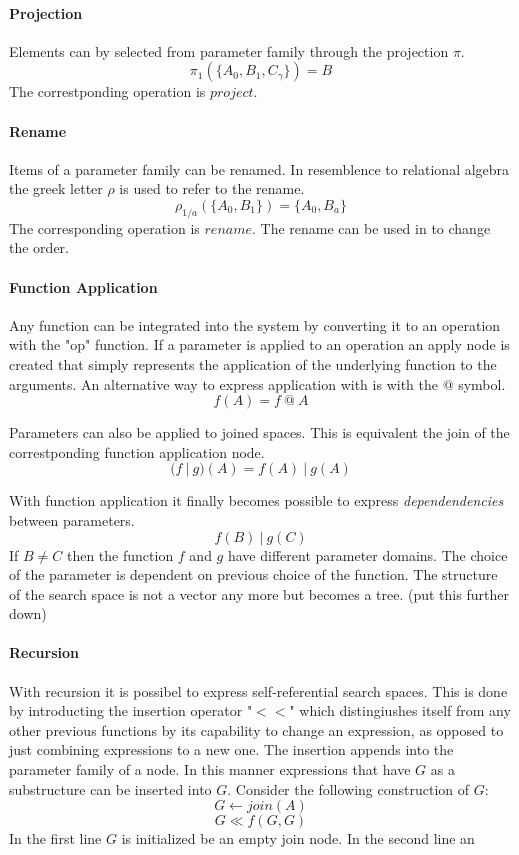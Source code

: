 \documentclass[english]{article}
\begin{document}
\paragraph{Projection}
Elements can by selected from parameter family through the projection $\pi$.
$$\pi_1(\{A_0, B_1, C_\gamma\}) = B$$
The correstponding operation is $project$.

\paragraph{Rename}
Items of a parameter family can be renamed. In resemblence to relational algebra the greek letter $\rho$ is used to refer to the rename.
$$\rho_{1/a}(\{A_{0}, B_{1}\}) = \{A_{0}, B_{a}\}$$
The corresponding operation is $rename$. The rename can be used in to change the order.

\paragraph{Function Application}
Any function can be integrated into the system by converting it to an operation with the "op" function. If a parameter is applied to an operation an apply node is created that simply represents the application of the underlying function to the arguments. An alternative way to express application with is with the @ symbol.
$$f(A) = f\ @\ A$$

Parameters can also be applied to joined spaces. This is equivalent the join of the correstponding function application node.
$$(f\ |\ g)(A) = f(A)\ |\ g(A)$$

With function application it finally becomes possible to express \textit{dependendencies} between parameters.
$$f(B)\ |\ g(C)$$
If $B \neq C$ then the function $f$ and $g$ have different parameter domains. The choice of the parameter is dependent on previous choice of the function.  The structure of the search space is not a vector any more but becomes a tree. (put this further down)

\paragraph{Recursion}
With recursion it is possibel to express self-referential search spaces. This is done by introducting the insertion operator "$<<$" which distingiushes itself from any other previous functions by its capability to change an expression, as opposed to just combining expressions to a new one. The insertion appends into the parameter family of a node. In this manner expressions that have $G$ as a substructure can be inserted into $G$. Consider the following construction of $G$:
$$G \leftarrow join(A)$$
$$ G  \ll f(G, G)$$
In the first line $G$ is initialized be an empty join node. In the second line an
\end{document}
